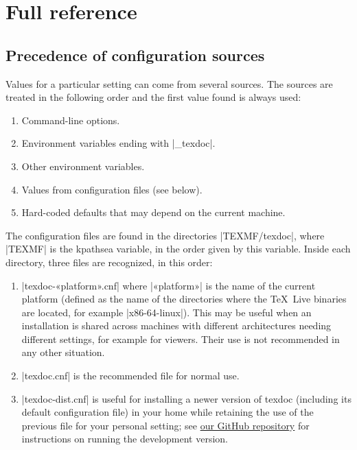 \documentclass[a4paper,oneside]{scrartcl}
\newcommand\texlive{\TeX~Live\xspace}
\begin{document}
\clearpage

\section{Full reference}

\subsection{Precedence of configuration sources}\label{ss-prec}

Values for a particular setting can come from several sources. The sources are
treated in the following order and the first value found is always used:
\begin{enumerate}
  \item Command-line options.
  \item Environment variables ending with |_texdoc|.
  \item Other environment variables.
  \item Values from configuration files (see below).
  \item Hard-coded defaults that may depend on the current machine.
\end{enumerate}

The configuration files are found in the directories |TEXMF/texdoc|, where
|TEXMF| is the kpathsea variable, in the order given by this variable. Inside
each directory, three files are recognized, in this order:
\begin{enumerate}
  \item |texdoc-«platform».cnf| where |«platform»| is the name of the current
    platform (defined as the name of the directories where the \texlive
    binaries are located, for example |x86-64-linux|). This may be useful when
    an installation is shared across machines with different architectures
    needing different settings, for example for viewers. Their use is not
    recommended in any other situation.
  \item |texdoc.cnf| is the recommended file for normal use.
  \item |texdoc-dist.cnf| is useful for installing a newer version of texdoc
    (including its default configuration file) in your home while retaining
    the use of the previous file for your personal setting; see
    \href{https://github.com/TeX-Live/texdoc}{our GitHub repository} for
    instructions on running the development version.
\end{enumerate}
\end{document}

